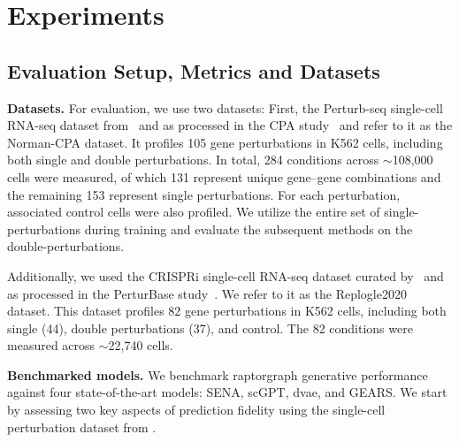 \section{Experiments}
\label{sec:results}
\subsection{Evaluation Setup, Metrics and Datasets}
\label{sec:results:setup}
\textbf{Datasets.} For evaluation, we use two datasets: First, the Perturb-seq single-cell RNA-seq dataset from~\citet{norman2019exploring} and as processed in the CPA study~\citep{lotfollahi_predicting_2023} and refer to it as the Norman-CPA dataset.
It profiles 105 gene perturbations in K562 cells, including both single and double perturbations.
In total, 284 conditions across $\sim$108,000 cells were measured, of which 131 represent unique gene–gene combinations and the remaining 153 represent single perturbations. For each perturbation, associated control cells were also profiled. 
We utilize the entire set of single-perturbations during training and evaluate the subsequent methods on the double-perturbations.

Additionally, we used the CRISPRi single-cell RNA-seq dataset curated by~\citet{replogle_combinatorial_2020} and as processed in the PerturBase study~\citep{wei_perturbase_2024}. We refer to it as the Replogle2020 dataset.
This dataset profiles 82 gene perturbations in K562 cells, including both single (44), double perturbations (37), and control.
The 82 conditions were measured across $\sim$22,740 cells.

\textbf{Benchmarked models.} We benchmark \gls{raptorgraph} generative performance against four state-of-the-art models: SENA, scGPT, \gls{dvae}, and GEARS.
We start by assessing two key aspects of prediction fidelity using the single-cell perturbation dataset from \citet{norman2019exploring}.

